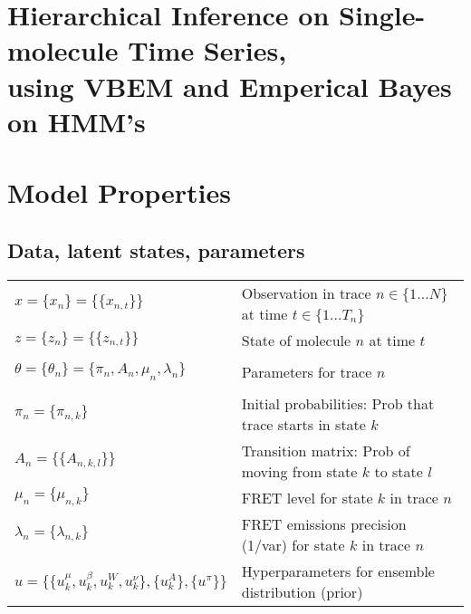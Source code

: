 
\newcommand{\ps}[2]{\ensuremath{p^*(#1 \:|\: #2)}}
\newcommand{\q}[2]{\ensuremath{q(#1 \:|\: #2)}}



\chapter*{Hierarchical Inference on Single-molecule Time Series,\\ using VBEM and Emperical Bayes on HMM's} 

\begin{KeepFromToc}
  \tableofcontents
\end{KeepFromToc}

\chapter{Model Properties}

\section{Data, latent states, parameters}

\hspace{\mathindent}
\begin{tabular}{ll}
  $x = \{x_n\} = \{\{x_{n,t}\}\}$   %
    & Observation in trace $n \in \{1 \ldots N\}$ at time $t \in \{1 \ldots T_n\}$ \\
  $z = \{z_n\} = \{\{z_{n,t}\}\}$ %
     & State of molecule $n$ at time $t$ \\
  \smallskip \\  
  $\theta = \{\theta_n\} = \{\pi_n, A_n, \mu_n, \lambda_n\}$ %
    & Parameters for trace $n$\\
  \smallskip \\  
  $\pi_n = \{\pi_{n,k}\}$ %
    & Initial probabilities: Prob that trace starts in state $k$ \\
  $A_n = \{\{A_{n,k,l}\}\}$ %
    & Transition matrix: Prob of moving from state $k$ to state $l$\\
  $\mu_n = \{\mu_{n,k}\}$ %
    & FRET level for state $k$ in trace $n$ \\
  $\lambda_n = \{\lambda_{n,k}\}$ %
    & FRET emissions precision (1/var) for state $k$ in trace $n$ \\
  $u = \{\{u^\mu_k, u^\beta_k, u^W_k, u^\nu_k \}, \{u^A_k\}, \{u^\pi\} \}$ %
    & Hyperparameters for ensemble distribution (prior)
\end{tabular}
\medskip

